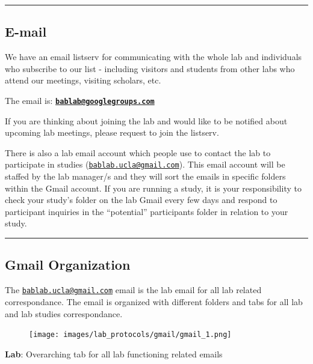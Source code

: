 \documentclass[
]{book}
\begin{document}
\begin{center}\rule{0.5\linewidth}{0.5pt}\end{center}

\hypertarget{e-mail}{%
\subsection{E-mail}\label{e-mail}}

We have an email listserv for communicating with the whole lab and individuals who subscribe to our list - including visitors and students from other labs who attend our meetings, visiting scholars, etc.

The email is: \textbf{\href{mailto:bablab@googlegroups.com}{\nolinkurl{bablab@googlegroups.com}}}

If you are thinking about joining the lab and would like to be notified about upcoming lab meetings, please request to join the listserv.

There is also a lab email account which people use to contact the lab to participate in studies (\href{mailto:bablab.ucla@gmail.com}{\nolinkurl{bablab.ucla@gmail.com}}). This email account will be staffed by the lab manager/s and they will sort the emails in specific folders within the Gmail account. If you are running a study, it is your responsibility to check your study's folder on the lab Gmail every few days and respond to participant inquiries in the ``potential'' participants folder in relation to your study.

\begin{center}\rule{0.5\linewidth}{0.5pt}\end{center}

\hypertarget{gmail-organization}{%
\subsection{Gmail Organization}\label{gmail-organization}}

The \href{mailto:bablab.ucla@gmail.com}{\nolinkurl{bablab.ucla@gmail.com}} email is the lab email for all lab related correspondance. The email is organized with different folders and tabs for all lab and lab studies correspondance.

\begin{figure}
\centering
\texttt{[image: images/lab\_protocols/gmail/gmail\_1.png]}
\caption{}
\end{figure}

\textbf{Lab}: Overarching tab for all lab functioning related emails
\end{document}
